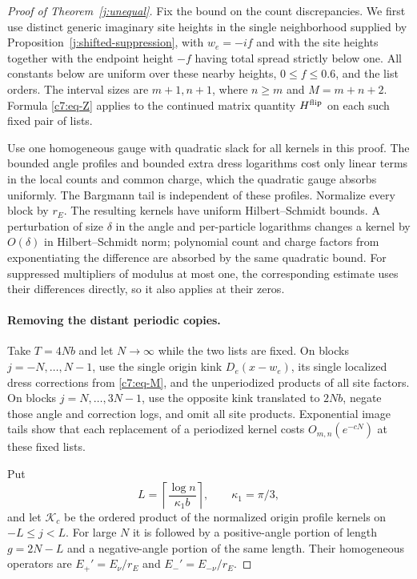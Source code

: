\begin{proof}[Proof of Theorem~\ref{j:unequal}]
Fix the bound on the count discrepancies. We first use distinct generic
imaginary site heights in the single neighborhood supplied by
Proposition~\ref{j:shifted-suppression}, with $w_e=-if$ and with the
site heights together with the endpoint height $-f$ having total spread
strictly below one. All constants below are uniform over these nearby heights,
$0\le f\le0.6$, and the list orders. The interval sizes are $m+1,n+1$,
where $n\ge m$ and $M=m+n+2$. Formula \eqref{c7:eq-Z} applies to the
continued matrix quantity $H^{\rm flip}$ on each such fixed pair of
lists.

Use one homogeneous gauge with quadratic slack for all kernels in this
proof. The bounded angle profiles and bounded extra dress logarithms
cost only linear terms in the local counts and common charge, which the
quadratic gauge absorbs uniformly. The Bargmann tail is independent of
these profiles. Normalize every block by $r_E$. The resulting kernels
have uniform Hilbert--Schmidt bounds. A perturbation of size $\delta$
in the angle and per-particle logarithms changes a kernel by
$O(\delta)$ in Hilbert--Schmidt norm; polynomial count and charge
factors from exponentiating the difference are absorbed by the same
quadratic bound. For suppressed multipliers of modulus at most one,
the corresponding estimate uses their differences directly, so it also
applies at their zeros.

\paragraph{Removing the distant periodic copies.}
Take $T=4Nb$ and let $N\to\infty$ while the two lists are fixed.
On blocks $j=-N,\ldots,N-1$, use the single origin kink
$D_e(x-w_e)$, its single localized dress corrections from
\eqref{c7:eq-M}, and the unperiodized products of all site factors.
On blocks $j=N,\ldots,3N-1$, use the opposite kink translated to
$2Nb$, negate those angle and correction logs, and omit all site
products. Exponential image tails show that each replacement of a
periodized kernel costs $O_{m,n}(e^{-cN})$ at these fixed lists.

Put
\[
 L=\left\lceil\frac{\log n}{\kappa_1b}\right\rceil,
 \qquad \kappa_1=\pi/3,
\]
and let $\mathcal K_c$ be the ordered product of the normalized origin
profile kernels on $-L\le j<L$. For large $N$ it is followed by a
positive-angle portion of length $g=2N-L$ and a negative-angle portion
of the same length. Their homogeneous operators are
$E_+'=E_{\nu}/r_E$ and $E_-'=E_{-\nu}/r_E$.


\end{proof}
